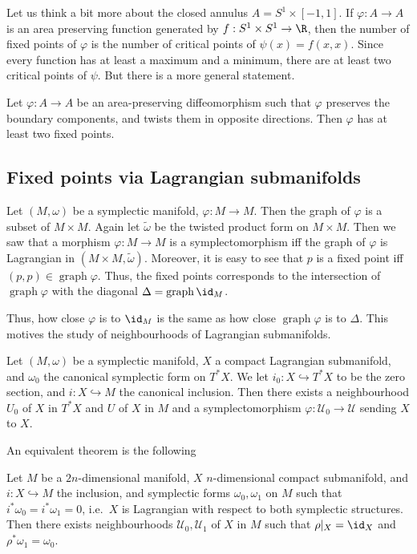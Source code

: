 \documentclass[a4paper]{article}
\DeclareMathOperator{\grph}{graph}
\begin{document}
Let us think a bit more about the closed annulus $A = S^1 \times [-1, 1]$. If $\varphi: A \to A$ is an area preserving function generated by $f: S^1 \times S^1 \to \R$, then the number of fixed points of $\varphi$ is the number of critical points of $\psi(x) = f(x, x)$. Since every function has at least a maximum and a minimum, there are at least two critical points of $\psi$. But there is a more general statement.
\begin{thm}
  Let $\varphi: A \to A$ be an area-preserving diffeomorphism such that $\varphi$ preserves the boundary components, and twists them in opposite directions. Then $\varphi$ has at least two fixed points.
\end{thm}

\subsection{Fixed points via Lagrangian submanifolds}
Let $(M, \omega)$ be a symplectic manifold, $\varphi: M \to M$. Then the graph of $\varphi$ is a subset of $M \times M$. Again let $\tilde{\omega}$ be the twisted product form on $M \times M$. Then we saw that a morphism $\varphi: M \to M$ is a symplectomorphism iff the graph of $\varphi$ is Lagrangian in $(M \times M, \tilde{\omega})$. Moreover, it is easy to see that $p$ is a fixed point iff $(p, p) \in \grph \varphi$. Thus, the fixed points corresponds to the intersection of $\grph \varphi$ with the diagonal $\Delta = \grph \id_M$.

Thus, how close $\varphi$ is to $\id_M$ is the same as how close $\grph \varphi$ is to $\Delta$. This motives the study of neighbourhoods of Lagrangian submanifolds.

\begin{thm}
  Let $(M, \omega)$ be a symplectic manifold, $X$ a compact Lagrangian submanifold, and $\omega_0$ the canonical symplectic form on $T^* X$. We let $i_0: X \hookrightarrow T^* X$ to be the zero section, and $i: X \hookrightarrow M$ the canonical inclusion. Then there exists a neighbourhood $U_0$ of $X$ in $T^* X$ and $U$ of $X$ in $M$ and a symplectomorphism $\varphi: \mathcal{U}_0 \to \mathcal{U}$ sending $X$ to $X$.
\end{thm}

An equivalent theorem is the following
\begin{thm}[Weinstein]
  Let $M$ be a $2n$-dimensional manifold, $X$ $n$-dimensional compact submanifold, and $i: X \hookrightarrow M$ the inclusion, and symplectic forms $\omega_0, \omega_1$ on $M$ such that $i^* \omega_0 = i^* \omega_1 = 0$, i.e.\ $X$ is Lagrangian with respect to both symplectic structures. Then there exists neighbourhoods $\mathcal{U}_0, \mathcal{U}_1$ of $X$ in $M$ such that $\rho|_X = \id_X $ and $\rho^* \omega_1 = \omega_0$.
\end{thm}
\end{document}
